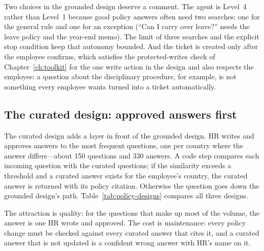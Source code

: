 Two choices in the grounded design deserve a comment. The agent is Level~4 rather than Level~1 because good policy answers often need two searches: one for the general rule and one for an exception (``Can I carry over leave?'' needs the leave policy and the year-end memo). The limit of three searches and the explicit stop condition keep that autonomy bounded. And the ticket is created only after the employee confirms, which satisfies the protected-writes check of Chapter~\ref{ch:toolkit} for the one write action in the design and also respects the employee: a question about the disciplinary procedure, for example, is not something every employee wants turned into a ticket automatically.

\subsection{The curated design: approved answers first}

The curated design adds a layer in front of the grounded design. HR writes and approves answers to the most frequent questions, one per country where the answer differs---about 150 questions and 330 answers. A code step compares each incoming question with the curated questions; if the similarity exceeds a threshold and a curated answer exists for the employee's country, the curated answer is returned with its policy citation. Otherwise the question goes down the grounded design's path. Table~\ref{tab:policy-designs} compares all three designs.

The attraction is quality: for the questions that make up most of the volume, the answer is one HR wrote and approved. The cost is maintenance: every policy change must be checked against every curated answer that cites it, and a curated answer that is not updated is a confident wrong answer with HR's name on it.

